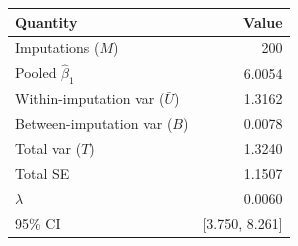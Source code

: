 \begin{tabular}{lr}
\toprule
Quantity & Value \\
\midrule
Imputations ($M$) & 200 \\
Pooled $\hat\beta_1$ & 6.0054 \\
Within-imputation var ($\bar U$) & 1.3162 \\
Between-imputation var ($B$) & 0.0078 \\
Total var ($T$) & 1.3240 \\
Total SE & 1.1507 \\
$\lambda$ & 0.0060 \\
95\% CI & [3.750, 8.261] \\
\bottomrule
\end{tabular}
